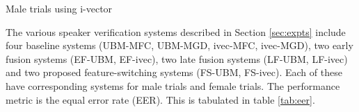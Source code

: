 \documentclass{article}
\begin{document}
\begin{table}
\begin{subtable}{.55\linewidth}
\centering
{
\caption{\small Male trials using i-vector}
\label{tab:eer_ivec_male}}
\end{subtable}%
\begin{subtable}{.55\linewidth}
\centering
\caption{\small Female trials using i-vector}
{
\label{tab:eer_ivec_female}}
\end{subtable}
\label{tab:eer}
\end{table}


The various speaker verification systems described in Section \ref{sec:expts} 
include four baseline systems (UBM-MFC, UBM-MGD, ivec-MFC, ivec-MGD), two early
fusion systems (EF-UBM, EF-ivec), two late fusion systems (LF-UBM, LF-ivec) 
and two proposed feature-switching systems (FS-UBM, FS-ivec). Each of these have 
corresponding systems for male trials and female trials. The performance metric 
is the equal error rate (EER). This is tabulated in table \ref{tab:eer}.
\end{document}
